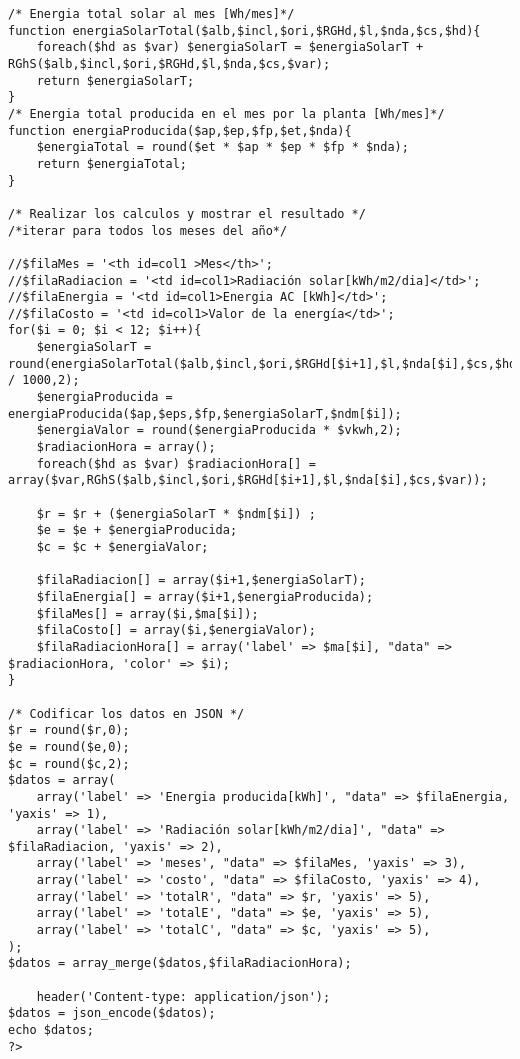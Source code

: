 \begin{verbatim}
/* Energia total solar al mes [Wh/mes]*/
function energiaSolarTotal($alb,$incl,$ori,$RGHd,$l,$nda,$cs,$hd){
	foreach($hd as $var) $energiaSolarT = $energiaSolarT + RGhS($alb,$incl,$ori,$RGHd,$l,$nda,$cs,$var);
	return $energiaSolarT;
}
/* Energia total producida en el mes por la planta [Wh/mes]*/
function energiaProducida($ap,$ep,$fp,$et,$nda){
	$energiaTotal = round($et * $ap * $ep * $fp * $nda);
	return $energiaTotal;
}

/* Realizar los calculos y mostrar el resultado */
/*iterar para todos los meses del año*/

//$filaMes = '<th id=col1 >Mes</th>';
//$filaRadiacion = '<td id=col1>Radiación solar[kWh/m2/dia]</td>';
//$filaEnergia = '<td id=col1>Energia AC [kWh]</td>';
//$filaCosto = '<td id=col1>Valor de la energía</td>';
for($i = 0; $i < 12; $i++){
	$energiaSolarT = round(energiaSolarTotal($alb,$incl,$ori,$RGHd[$i+1],$l,$nda[$i],$cs,$hd) / 1000,2);
	$energiaProducida = energiaProducida($ap,$eps,$fp,$energiaSolarT,$ndm[$i]);
	$energiaValor = round($energiaProducida * $vkwh,2);
	$radiacionHora = array();
	foreach($hd as $var) $radiacionHora[] = array($var,RGhS($alb,$incl,$ori,$RGHd[$i+1],$l,$nda[$i],$cs,$var));

	$r = $r + ($energiaSolarT * $ndm[$i]) ;
	$e = $e + $energiaProducida;
	$c = $c + $energiaValor;

	$filaRadiacion[] = array($i+1,$energiaSolarT);
	$filaEnergia[] = array($i+1,$energiaProducida);
	$filaMes[] = array($i,$ma[$i]);
	$filaCosto[] = array($i,$energiaValor);
	$filaRadiacionHora[] = array('label' => $ma[$i], "data" => $radiacionHora, 'color' => $i); 
}

/* Codificar los datos en JSON */
$r = round($r,0);
$e = round($e,0);
$c = round($c,2);
$datos = array(
	array('label' => 'Energia producida[kWh]', "data" => $filaEnergia, 'yaxis' => 1),
	array('label' => 'Radiación solar[kWh/m2/dia]', "data" => $filaRadiacion, 'yaxis' => 2),
	array('label' => 'meses', "data" => $filaMes, 'yaxis' => 3),
	array('label' => 'costo', "data" => $filaCosto, 'yaxis' => 4),
	array('label' => 'totalR', "data" => $r, 'yaxis' => 5),
	array('label' => 'totalE', "data" => $e, 'yaxis' => 5),
	array('label' => 'totalC', "data" => $c, 'yaxis' => 5),
);
$datos = array_merge($datos,$filaRadiacionHora);

	header('Content-type: application/json');
$datos = json_encode($datos);
echo $datos;
?>
\end{verbatim}
